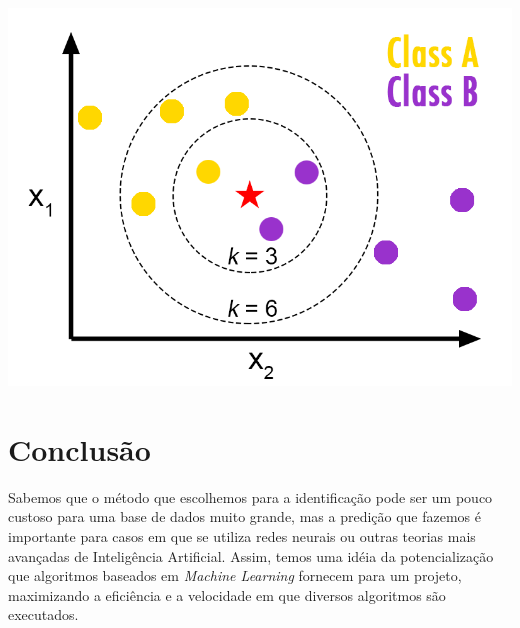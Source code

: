 \documentclass[a0,portrait]{a0poster}
\begin{document}
\begin{multicols}{2}
\begin{center}\vspace{1cm}
    \includegraphics[width=0.5\linewidth]{knn.png}
\end{center}\vspace{1cm}

\section*{Conclusão}
Sabemos que o método que escolhemos para a identificação pode ser um pouco custoso para uma base de dados muito grande, mas a predição que fazemos é importante para casos em que se utiliza redes neurais ou outras teorias mais avançadas de Inteligência Artificial. Assim, temos uma idéia da potencialização que algoritmos baseados em \emph{Machine Learning} fornecem para um projeto, maximizando a eficiência e a velocidade em que diversos algoritmos são executados.
\nocite{*}

\end{multicols}
\end{document}
